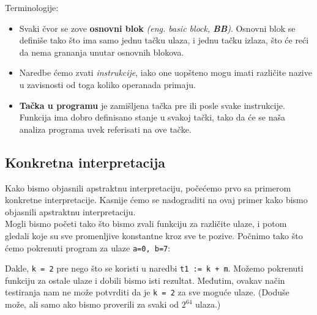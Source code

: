 Terminologije:
\begin{itemize}
\item Svaki čvor se zove \textbf{osnovni blok} \emph{(eng. basic block, \textbf{BB})}. Osnovni blok se definiše tako što ima samo jednu tačku ulaza, i jednu tačku izlaza, što će reći da nema grananja unutar osnovnih blokova.
\item Naredbe ćemo zvati \emph{instrukcije}, iako one uopšteno mogu imati različite nazive u zavisnosti od toga koliko operanada primaju.
\item \textbf{Tačka u programu} je zamišljena tačka pre ili posle svake instrukcije. Funkcija ima dobro definisano stanje u svakoj tački, tako da će se naša analiza programa uvek referisati na ove tačke.
\end{itemize}


\subsection{Konkretna interpretacija}
\label{subsec:concreteimpr}
Kako bismo objasnili apstraktnu interpretaciju, počećemo prvo sa primerom konkretne interpretacije.
Kasnije ćemo se nadograditi na ovaj primer kako bismo objasnili apstraktnu interpretaciju. \\
Mogli bismo početi tako što bismo zvali funkciju za različite ulaze, i potom gledali koje su sve promenljive konstantne
kroz sve te pozive. Počnimo tako što ćemo pokrenuti program za ulaze \texttt{a=0, b=7}:

Dakle, \texttt{k = 2} pre nego što se koristi u naredbi \texttt{t1 := k + m}. Možemo pokrenuti funkciju za ostale ulaze i dobili bismo isti rezultat.
Međutim, ovakav način testiranja nam ne može potvrditi da je \texttt{k = 2} za sve moguće ulaze. (Doduše može, ali samo ako bismo proverili za svaki od $2^{64}$ ulaza.)


